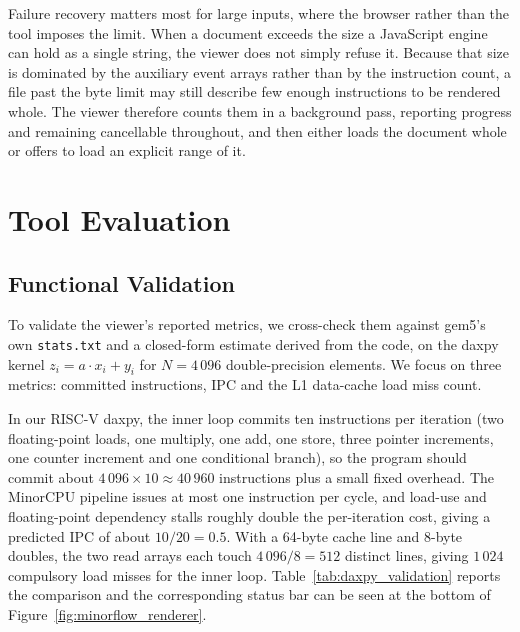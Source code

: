 \documentclass{ceurart}
\begin{document}
Failure recovery matters most for large inputs, where the browser rather than the tool imposes the limit. When a document exceeds the size a JavaScript engine can hold as a single string, the viewer does not simply refuse it. Because that size is dominated by the auxiliary event arrays rather than by the instruction count, a file past the byte limit may still describe few enough instructions to be rendered whole. The viewer therefore counts them in a background pass, reporting progress and remaining cancellable throughout, and then either loads the document whole or offers to load an explicit range of it.

\section{Tool Evaluation}
\label{sec:evaluation}

\subsection{Functional Validation}

To validate the viewer's reported metrics, we cross-check them against gem5's own \texttt{stats.txt} and a closed-form estimate derived from the code, on the daxpy kernel \(z_i = a \cdot x_i + y_i\) for \(N=4\,096\) double-precision elements. We focus on three metrics: committed instructions, IPC and the L1 data-cache load miss count.

In our RISC-V daxpy, the inner loop commits ten instructions per iteration (two floating-point loads, one multiply, one add, one store, three pointer increments, one counter increment and one conditional branch), so the program should commit about \(4\,096 \times 10 \approx 40\,960\) instructions plus a small fixed overhead. The MinorCPU pipeline issues at most one instruction per cycle, and load-use and floating-point dependency stalls roughly double the per-iteration cost, giving a predicted IPC of about \(10/20 = 0.5\). With a 64-byte cache line and 8-byte doubles, the two read arrays each touch \(4\,096/8 = 512\) distinct lines, giving \(1\,024\) compulsory load misses for the inner loop. Table~\ref{tab:daxpy_validation} reports the comparison and the corresponding status bar can be seen at the bottom of Figure~\ref{fig:minorflow_renderer}.
\end{document}
